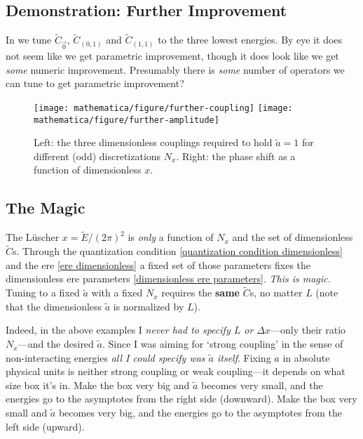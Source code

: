 \subsection{Demonstration: Further Improvement}

In  we tune $\tilde{C}_{\vec{0}}$, $\tilde{C}_{(0,1)}$ and $\tilde{C}_{(1,1)}$ to the three lowest energies.
By eye it does not seem like we get parametric improvement, though it does look like we get \emph{some} numeric improvement.
Presumably there is \emph{some} number of operators we can tune to get parametric improvement?

\begin{figure}
	\texttt{[image: mathematica/figure/further-coupling]}
	\texttt{[image: mathematica/figure/further-amplitude]}
	\caption{
		Left: the three dimensionless couplings required to hold $\tilde{a}=1$ for different (odd) discretizations $N_x$.
		Right: the phase shift as a function of dimensionless $x$.
	}
    \label{fig:tune three spheres}
\end{figure}

\subsection{The Magic}

The L\"{u}scher $x=\tilde{E}/(2\pi)^2$ is \emph{only} a function of $N_x$ and the set of dimensionless $\tilde{C}$s.
Through the quantization condition \eqref{quantization condition dimensionless} and the ere \eqref{ere dimensionless} a fixed set of those parameters fixes the dimensionless ere parameters \eqref{dimensionless ere parameters}.
\emph{This is magic.}
Tuning to a fixed $\tilde{a}$ with a fixed $N_x$ requires the \textbf{same} $\tilde{C}$s, no matter $L$ (note that the dimensionless $\tilde{a}$ is normalized by $L$).

Indeed, in the above examples I \emph{never had to specify $L$ or $\Delta x$}---only their ratio $N_x$---and the desired $\tilde{a}$.
Since I was aiming for `strong coupling' in the sense of non-interacting energies \emph{all I could specify was $\tilde{a}$ itself}.
Fixing $a$ in absolute physical units is neither strong coupling or weak coupling---it depends on what size box it's in.
Make the box very big and $\tilde{a}$ becomes very small, and the energies go to the asymptotes from the right side (downward).
Make the box very small and $\tilde{a}$ becomes very big, and the energies go to the asymptotes from the left  side (upward).

